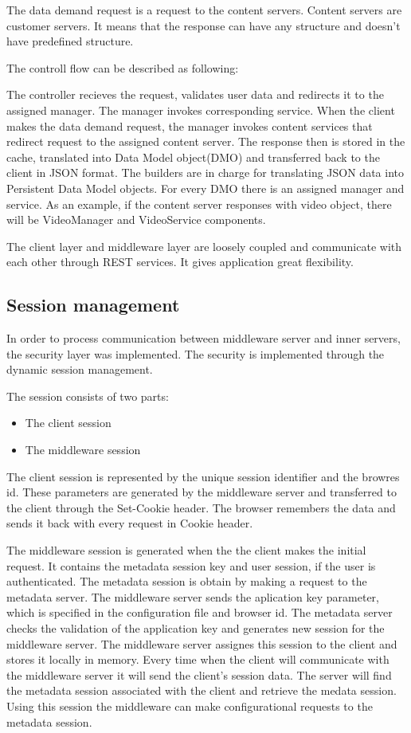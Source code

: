 The data demand request is a request to the content servers. Content servers are customer servers. It means that the response can have any structure and doesn't have predefined structure. 

The controll flow can be described as following:

The controller recieves the request, validates user data and redirects it to the assigned manager. The manager  invokes corresponding service. When the client makes the data demand request, the manager invokes content services that redirect request to the assigned content server. The response then is stored in the cache, translated into Data Model object(DMO) and transferred back to the client in JSON format. The builders are in charge for translating JSON data into Persistent Data Model objects. For every DMO there is an assigned manager and service. As an example, if the content server responses with video object, there will be VideoManager and VideoService components.   

The client layer and middleware layer are loosely coupled and communicate with each other through REST services. It gives application great flexibility.



\subsection{Session management}

In order to process communication between middleware server and inner servers, the security layer was implemented. The security is implemented through the dynamic session management.

The session consists of two parts: 
\begin{itemize}
	\item The client session
	\item The middleware session
\end{itemize}

The client session is represented by the unique session identifier and the browres id. These parameters are generated by the middleware server and transferred to the client through the Set-Cookie header. The browser remembers the data and sends it back with every request in Cookie header.

The middleware session is generated when the the client makes the initial request. It contains the metadata session key and user session, if the user is authenticated. The metadata session is obtain by making a request to the metadata server. The middleware server sends the aplication key parameter, which is specified in the configuration file and browser id. The metadata server checks the validation of the application key and generates new session for the middleware server. The middleware server assignes this session to the client and stores it locally in memory. Every time when the client will communicate with the middleware server it will send the client's session data. The server will find the metadata session associated with the client and retrieve the medata session. Using this session the middleware can make configurational requests to the metadata session.  


